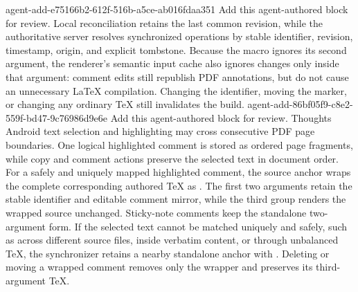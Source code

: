 \agentProposedEdit
  {agent-add-e75166b2-612f-516b-a5ce-ab016fdaa351}
  {Add this agent-authored block for review.}
  {}
  {Local reconciliation retains the last common revision, while the authoritative server resolves synchronized operations by stable identifier, revision, timestamp, origin, and explicit tombstone.}
Because the macro ignores its second argument, the renderer's semantic input
cache also ignores changes only inside that argument: comment edits still
republish PDF annotations, but do not cause an unnecessary LaTeX compilation.
Changing the identifier, moving the marker, or changing any ordinary TeX still
invalidates the build.
\agentProposedEdit
  {agent-add-86bf05f9-c8e2-559f-bd47-9c76986d9e6e}
  {Add this agent-authored block for review.}
  {}
  {Thoughts Android text selection and highlighting may cross consecutive PDF page boundaries.
One logical highlighted comment is stored as ordered page fragments, while copy and comment actions preserve the selected text in document order.
For a safely and uniquely mapped highlighted comment, the source anchor wraps the complete corresponding authored TeX as .
The first two arguments retain the stable identifier and editable comment mirror, while the third group renders the wrapped source unchanged.
Sticky-note comments keep the standalone two-argument form.
If the selected text cannot be matched uniquely and safely, such as across different source files, inside verbatim content, or through unbalanced TeX, the synchronizer retains a nearby standalone anchor with .
Deleting or moving a wrapped comment removes only the wrapper and preserves its third-argument TeX.}
